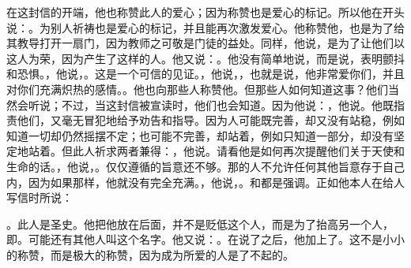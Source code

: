 \par

\par

在这封信的开端，他也称赞此人的爱心；因为称赞也是爱心的标记。所以他在开头说：。为别人祈祷也是爱心的标记，并且能再次激发爱心。他称赞他，也是为了给其教导打开一扇门，因为教师之可敬是门徒的益处。同样，他说，是为了让他们以这人为荣，因为产生了这样的人。他又说：。他没有简单地说，而是说，表明颤抖和恐惧。，他说，。这是一个可信的见证。，他说，，也就是说，他非常爱你们，并且对你们充满炽热的感情。。他也向那些人称赞他。但那些人如何知道这事？他们当然会听说；不过，当这封信被宣读时，他们也会知道。因为他说：，他说。他既指责他们，又毫无冒犯地给予劝告和指导。因为人可能既完善，却又没有站稳，例如知道一切却仍然摇摆不定；也可能不完善，却站着，例如只知道一部分，却没有坚定地站着。但此人祈求两者兼得：，他说。请看他是如何再次提醒他们关于天使和生命的话。，他说，。仅仅遵循的旨意还不够。那的人不允许任何其他旨意存于自己内，因为如果那样，他就没有完全充满。，他说，。和都是强调。正如他本人在给人写信时所说：\par

。此人是圣史。他把他放在后面，并不是贬低这个人，而是为了抬高另一个人，即。可能还有其他人叫这个名字。他又说：。在说了之后，他加上了。这不是小小的称赞，而是极大的称赞，因为成为所爱的人是了不起的。\par

